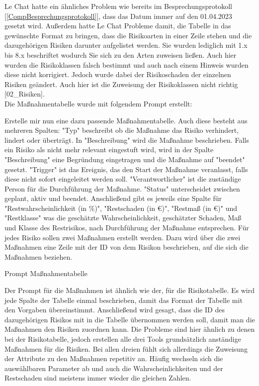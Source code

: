 Le Chat hatte ein ähnliches Problem wie bereits im Besprechungsprotokoll [\autoref{CompBesprechungsprotokoll}], dass das 
Datum immer auf den 01.04.2023 gesetzt wird. Außerdem hatte Le Chat Probleme damit, die Tabelle in das gewünschte Format
zu bringen, dass die Risikoarten in einer Zeile stehen und die dazugehörigen Risiken darunter aufgelistet werden. Sie wurden 
lediglich mit 1.x bis 8.x beschriftet wodurch Sie sich zu den Arten zuweisen ließen. Auch 
hier wurden die Risikoklassen falsch bestimmt und auch nach einem Hinweis wurden diese nicht korrigiert. Jedoch wurde 
dabei der Risikoschaden der einzelnen Risiken geändert. Auch hier ist die Zuweisung der Risikoklassen nicht richtig [02\_Risiken].\\

Die Maßnahmentabelle wurde mit folgendem Prompt erstellt:

\begin{prompt}[H]
    \begin{tcolorbox}[colback=gray!20, colframe=gray!20, boxrule=0pt, sharp corners] 
        Erstelle mir nun eine dazu passende Maßnahmentabelle. Auch diese besteht aus mehreren Spalten: "Typ" beschreibt 
        ob die Maßnahme das Risiko verhindert, lindert oder überträgt. In "Beschreibung" wird die Maßnahme beschrieben. 
        Falls ein Risiko als nicht mehr relevant eingestuft wird, wird in der Spalte "Beschreibung" eine Begründung 
        eingetragen und die Maßnahme auf "beendet" gesetzt. "Trigger" ist das Ereignis, das den Start der Maßnahme 
        veranlasst, falls diese nicht sofort eingeleitet werden soll. "Verantwortlicher" ist die zuständige Person für 
        die Durchführung der Maßnahme. "Status" unterscheidet zwischen geplant, aktiv und beendet. Anschließend gibt es 
        jeweils eine Spalte für "Restwahrscheinlichkeit (in \%)", "Restschaden (in €)", "Restmaß (in €)" und "Restklasse" 
        was die geschätzte Wahrscheinlichkeit, geschätzter Schaden, Maß und Klasse des Restrisikos, nach Durchführung der 
        Maßnahme entsprechen. Für jedes Risiko sollen zwei Maßnahmen erstellt werden. Dazu wird über die zwei Maßnahmen 
        eine Zeile mit der ID von dem Risikon beschrieben, auf die sich die Maßnahmen beziehen.
        \vfill
    \end{tcolorbox}
    \caption{Prompt Maßnahmentabelle}
    \label{Prompt Maßnahmentabelle}
\end{prompt}

Der Prompt für die Maßnahmen ist ähnlich wie der, für die Risikotabelle. Es wird jede Spalte der Tabelle einmal beschrieben,
damit das Format der Tabelle mit den Vorgaben übereinstimmt. Anschließend wird gesagt, dass die ID des dazugehörigen Risikos
mit in die Tabelle übernommen werden soll, damit man die Maßnahmen den Risiken zuordnen kann. Die Probleme sind hier 
ähnlich zu denen bei der Risikotabelle, jedoch erstellen alle drei Tools grundsätzlich anständige Maßnahmen für die Risiken.
Bei allen dreien fühlt sich allerdings die Zuweisung der Attribute zu den Maßnahmen repetitiv an. Häufig wechseln sich die 
auswählbaren Parameter ab und auch die Wahrscheinlichkeiten und der Restschaden sind meistens immer wieder die gleichen Zahlen.\\

